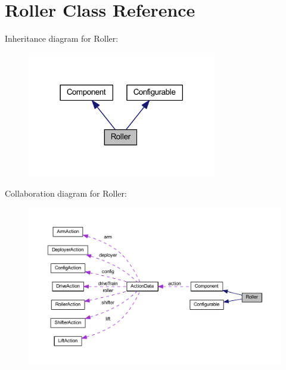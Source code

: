 \hypertarget{class_roller}{
\section{\-Roller \-Class \-Reference}
\label{class_roller}
}


\-Inheritance diagram for \-Roller\-:\nopagebreak
\begin{figure}[H]
\begin{center}
\leavevmode
\includegraphics[width=234pt]{class_roller__inherit__graph}
\end{center}
\end{figure}


\-Collaboration diagram for \-Roller\-:\nopagebreak
\begin{figure}[H]
\begin{center}
\leavevmode
\includegraphics[width=350pt]{class_roller__coll__graph}
\end{center}
\end{figure}
